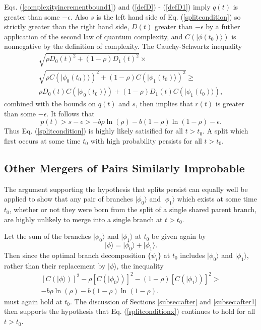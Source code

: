 \documentclass[twocolumn,amsmath,amssymb]{revtex4-1}
\begin{document}
Eqs. (\ref{complexityincrementbound1}) and (\ref{defD}) - (\ref{defD1}) imply $q(t)$ is 
greater than some $-\epsilon$.
Also $s$ is the left hand side of  Eq. (\ref{splitcondition})
so strictly greater than the right hand side, $D(t)$ greater than $-\epsilon$
by a futher application
of the second law of quantum complexity, and $C(|\phi(t_0) \rangle )$ is nonnegative by the definition of
complexity.
The Cauchy-Schwartz inequality 
\begin{multline}
  \label{cauchyschwartz}
  \sqrt{\rho D_0(t)^2 + (1 - \rho) D_1(t)^2} \times \\
  \sqrt{\rho C(|\phi_0(t_0) \rangle )^2 + (1 - \rho)C(|\phi_1(t_0) \rangle )^2} \ge \\  
\rho D_0(t)C(|\phi_0(t_0) \rangle ) + (1 - \rho) D_1(t)C(|\phi_1(t_0) \rangle ),
\end{multline}
combined with the bounds on $q(t)$ and $s$, then implies that
$r(t)$ is greater than some $-\epsilon$. It follows that
\begin{equation}
  \label{branchingt}
  p(t) > s - \epsilon >
  -b \rho \ln( \rho) - b ( 1 - \rho) \ln( 1 - \rho) - \epsilon.
\end{equation}
Thus Eq. (\ref{splitcondition}) is highly likely satisified for all $t > t_0$.
A split which first occurs at some time $t_0$ with
high probability persists
for all $t > t_0$.



\subsection{\label{subsec:dontmerge} Other Mergers of Pairs Similarly Improbable}

The argument supporting the hypothesis that splits persist can equally well be applied
to show that any pair of branches $|\phi_0 \rangle $ and
$|\phi_1 \rangle $ which exists at some time $t_0$, whether or
not they were born from the split
of a single shared parent branch, are highly unlikely to
merge into a single branch at $t > t_0$.

Let the sum of the branches $|\phi_0 \rangle $ and $|\phi_1 \rangle $ at $t_0$ be given
again by
\begin{equation}\label{splitphix}
|\phi \rangle  = |\phi_0 \rangle  + |\phi_1 \rangle .
\end{equation}
Then since the optimal branch decomposition
$\{ \psi_i\}$ at $t_0$ includes $|\phi_0 \rangle $ and $|\phi_1 \rangle $, rather than
their replacement by $|\phi \rangle $, the inequality
\begin{multline}\label{splitconditionx}
[C( |\phi \rangle )]^2 - \rho [C( |\phi_0 \rangle )]^2 - ( 1 - \rho) [C( |\phi_1 \rangle )]^2 > \\
-b \rho \ln( \rho) - b ( 1 - \rho) \ln( 1 - \rho).
\end{multline}
must again hold at $t_0$. The discussion of Sections \ref{subsec:after}
and \ref{subsec:after1} then supports the hypothesis that
Eq. (\ref{splitconditionx}) continues to hold for all $t > t_0$.
\end{document}
